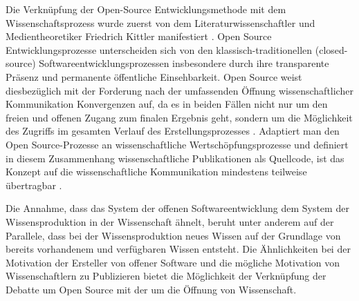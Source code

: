Die Verknüpfung der Open-Source Entwicklungsmethode mit dem Wissenschaftsprozess wurde zuerst von dem Literaturwissenschaftler und Medientheoretiker Friedrich Kittler manifestiert \cite{cite:1}. Open Source Entwicklungsprozesse unterscheiden sich von den klassisch-traditionellen (closed-source) Softwareentwicklungsprozessen insbesondere durch ihre transparente Präsenz und permanente öffentliche Einsehbarkeit. Open Source weist diesbezüglich mit der Forderung nach der umfassenden Öffnung wissenschaftlicher Kommunikation Konvergenzen auf, da es in beiden Fällen nicht nur um den freien und offenen Zugang zum finalen Ergebnis geht, sondern um die Möglichkeit des Zugriffs im gesamten Verlauf des Erstellungsprozesses \cite{kelty_2004_pruefen!}. Adaptiert man den Open Source-Prozesse an wissenschaftliche Wertschöpfungsprozesse und definiert in diesem Zusammenhang wissenschaftliche Publikationen als Quellcode, ist das Konzept auf die wissenschaftliche Kommunikation mindestens teilweise übertragbar \cite{Singh_2008} \cite{Bradley_2008} \cite{dorschel_2006_open} \cite{Bradley_2007} \cite{Willinsky_2005}.

Die Annahme, dass das System der offenen Softwareentwicklung dem System der Wissensproduktion in der Wissenschaft ähnelt, beruht unter anderem auf der Parallele, dass bei der Wissensproduktion neues Wissen auf der Grundlage von bereits vorhandenem und verfügbaren Wissen entsteht. Die Ähnlichkeiten bei der Motivation der Ersteller von offener Software und die mögliche Motivation von Wissenschaftlern zu Publizieren bietet die Möglichkeit der Verknüpfung der Debatte um Open Source mit der um die Öffnung von Wissenschaft.

